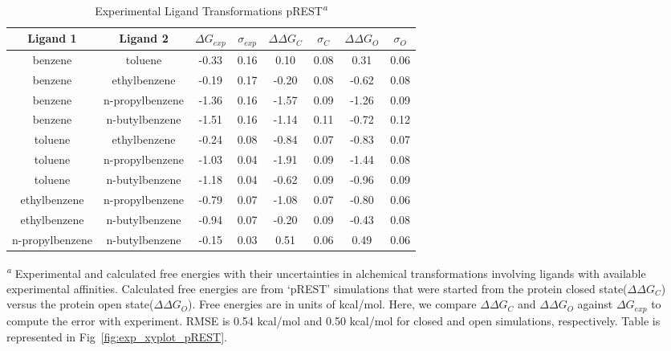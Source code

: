 \begin{table}[!htb]
\centering
\caption{Experimental Ligand Transformations pREST\textsuperscript{\emph{a}}}
\label{tbl:exp_pREST_set}
\begin{tabular}{|c|c|c|c|c|c|c|c|}
\hline
\textbf{Ligand 1} & \textbf{Ligand 2} & \boldmath$\Delta G_{exp}$  & \boldmath$\sigma_{exp}$ & \boldmath$\Delta\Delta G_{C}$ & \boldmath$\sigma_{C}$ & \boldmath$\Delta\Delta G_{O}$ & \boldmath$\sigma_{O}$ \\ \hline
benzene         & toluene         & -0.33 & 0.16  & 0.10  & 0.08  & 0.31  & 0.06          \\ \hline
benzene         & ethylbenzene    &-0.19  & 0.17  & -0.20 & 0.08  & -0.62 & 0.08          \\ \hline
benzene         & n-propylbenzene & -1.36 & 0.16  & -1.57 & 0.09  & -1.26 & 0.09         \\ \hline
benzene         & n-butylbenzene  & -1.51 & 0.16  & -1.14 & 0.11  & -0.72 & 0.12         \\ \hline
toluene         & ethylbenzene    & -0.24 & 0.08  & -0.84 & 0.07  & -0.83 & 0.07          \\ \hline
toluene         & n-propylbenzene & -1.03 & 0.04  & -1.91 & 0.09  & -1.44 & 0.08          \\ \hline
toluene         & n-butylbenzene  & -1.18 & 0.04  & -0.62 & 0.09  & -0.96 & 0.09          \\ \hline
ethylbenzene    & n-propylbenzene & -0.79 & 0.07  & -1.08 & 0.07  & -0.80 & 0.06         \\ \hline
ethylbenzene    & n-butylbenzene  & -0.94 & 0.07  & -0.20 & 0.09  & -0.43 & 0.08         \\ \hline
n-propylbenzene & n-butylbenzene  & -0.15 & 0.03  & 0.51  & 0.06  & 0.49  & 0.06       \\ \hline
\end{tabular}

\textsuperscript{\emph{a}} Experimental and calculated free energies with their uncertainties in alchemical transformations involving ligands with available experimental affinities.
Calculated free energies are from `pREST' simulations that were started from the protein closed state(\boldmath$\Delta\Delta G_{C}$) versus the protein open state(\boldmath$\Delta\Delta G_{O}$). 
Free energies are in units of kcal/mol.
Here, we compare \boldmath$\Delta\Delta G_{C}$ and \boldmath$\Delta\Delta G_{O}$ against \boldmath$\Delta G_{exp}$ to compute the error with experiment.
RMSE is 0.54 kcal/mol and 0.50 kcal/mol for closed and open simulations, respectively.
Table is represented in Fig~\ref{fig:exp_xyplot_pREST}.
\end{table}
